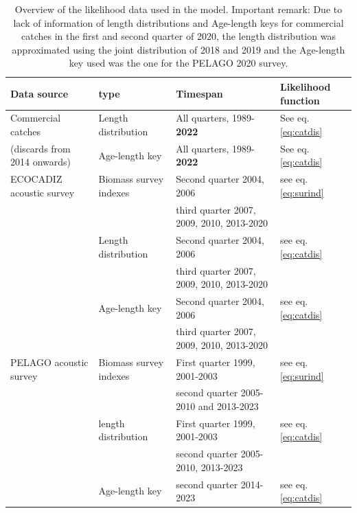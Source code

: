 \documentclass[review]{elsarticle}
\begin{document}
\begin{table}[h]
\centering
\small\small
\label{likedesc}
\begin{tabular}{l| l l l}
Data source & type & Timespan & Likelihood function  \\
\hline
Commercial catches  & Length distribution & All quarters, 1989-\textbf{2022} & See eq. \ref{eq:catdis}\\
(discards from 2014 onwards) & Age-length key & All quarters, 1989-\textbf{2022} &  See eq. \ref{eq:catdis}\\
ECOCADIZ acoustic survey & Biomass survey indexes & Second quarter 2004, 2006 & see eq. \ref{eq:surind}\\
& & third quarter 2007, 2009, 2010, 2013-2020 & \\
& Length distribution & Second quarter 2004, 2006 & see eq. \ref{eq:catdis}\\
& & third quarter 2007, 2009, 2010, 2013-2020 & \\
& Age-length key & Second quarter 2004, 2006 & see eq. \ref{eq:catdis}\\
& & third quarter 2007, 2009, 2010, 2013-2020 & \\
PELAGO acoustic survey & Biomass survey indexes & First quarter 1999, 2001-2003 &  see eq. \ref{eq:surind}\\
& & second quarter 2005-2010 and 2013-2023 & \\
& length distribution &  First quarter 1999, 2001-2003 &  see eq. \ref{eq:catdis}\\
& & second quarter 2005-2010, 2013-2023 & \\
& Age-length key &  second quarter 2014-2023 &  see eq. \ref{eq:catdis}\\
\hline
\end{tabular}
\caption{Overview of the likelihood data used in the model. Important remark: Due to lack of information of length distributions and Age-length keys for commercial catches in the first and second quarter of 2020, the length distribution was approximated using the joint distribution of 2018 and 2019 and the Age-length key used was the one for the PELAGO 2020 survey. }
\end{table}
\end{document}
